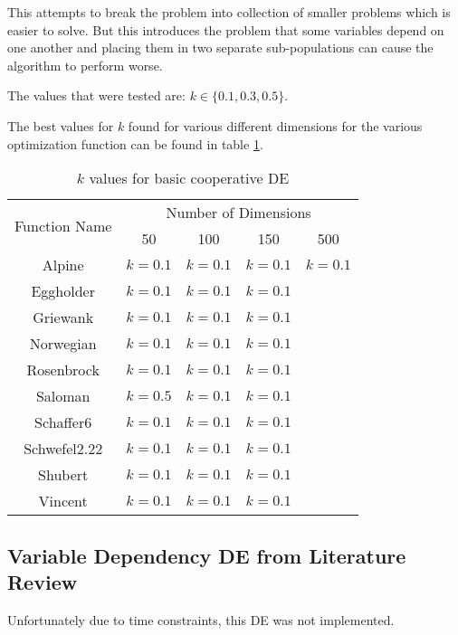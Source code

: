 \documentclass[hidelinks,english,conference]{IEEEtran}
\begin{document}
        This attempts to break the problem into collection of smaller problems which is easier to solve. But this introduces the problem that some variables depend on one another and placing them in two separate sub-populations can cause the algorithm to perform worse.
		
        The values that were tested are: $k \in \lbrace 0.1, 0.3, 0.5 \rbrace$.
        
		The best values for $k$ found for various different dimensions for the various optimization function can be found in table \ref{table_basic_de_k_value}.

		\begin{table}
			\centering
			\begin{tabular}{ | c | c | c | c | c | }
				\hline
				\multirow{2}{*}{Function Name} & \multicolumn{4}{|c|}{Number of Dimensions} \\\cline{2-5}
				 & 50 & 100 & 150 & 500 \\
				\hline
				Alpine & $k=0.1$ & $k=0.1$ & $k=0.1$ & $k=0.1$ \\
				\hline
				Eggholder & $k=0.1$ & $k=0.1$ & $k=0.1$ &  \\
				\hline
				Griewank & $k=0.1$ & $k=0.1$ & $k=0.1$ & \\
				\hline
				Norwegian & $k=0.1$ & $k=0.1$ & $k=0.1$ & \\
				\hline
				Rosenbrock & $k=0.1$ & $k=0.1$ & $k=0.1$ & \\
				\hline
				Saloman & $k=0.5$ & $k=0.1$ & $k=0.1$ & \\
				\hline
				Schaffer6 & $k=0.1$ & $k=0.1$ & $k=0.1$ & \\
				\hline
				Schwefel2.22 & $k=0.1$ & $k=0.1$ & $k=0.1$ & \\
				\hline
				Shubert & $k=0.1$ & $k=0.1$ & $k=0.1$ & \\
				\hline
				Vincent & $k=0.1$ & $k=0.1$ & $k=0.1$ & \\
				\hline
			\end{tabular}
			\caption{$k$ values for basic cooperative DE}
			\label{table_basic_de_k_value}
		\end{table}

	\subsection{Variable Dependency DE from Literature Review} %
		Unfortunately due to time constraints, this DE was not implemented.
\end{document}
